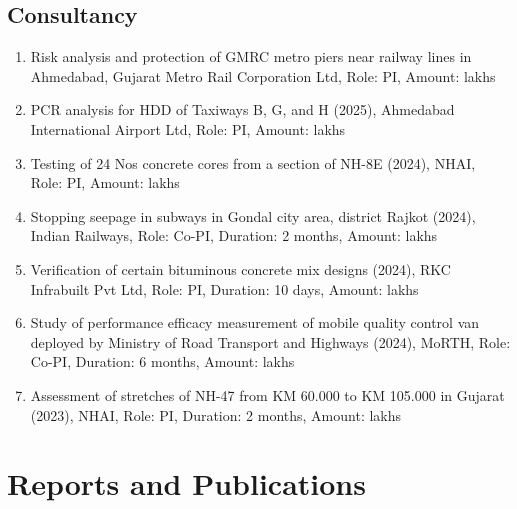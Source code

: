 \documentclass[12pt]{article}
\begin{document}
\hfill
\subsection*{Consultancy}
\begin{enumerate}
	\item Risk analysis and protection of GMRC metro piers near railway lines in Ahmedabad, Gujarat Metro Rail Corporation Ltd, Role: PI, Amount:  lakhs
	\item PCR analysis for HDD of Taxiways B, G, and H (2025), Ahmedabad International Airport Ltd, Role: PI, Amount:  lakhs
	\item Testing of 24 Nos concrete cores from a section of NH-8E (2024), NHAI, Role: PI, Amount:  lakhs
	\item Stopping seepage in subways in Gondal city area, district Rajkot (2024), Indian Railways, Role: Co-PI, Duration: 2 months, Amount:  lakhs
	\item Verification of certain bituminous concrete mix designs (2024), RKC Infrabuilt Pvt Ltd, Role: PI, Duration: 10 days, Amount:  lakhs
	\item Study of performance efficacy measurement of mobile quality control van deployed by Ministry of Road Transport and Highways (2024), MoRTH, Role: Co-PI, Duration: 6 months, Amount:  lakhs
	\item Assessment of stretches of NH-47 from KM 60.000 to KM 105.000 in Gujarat (2023), NHAI, Role: PI, Duration: 2 months, Amount:  lakhs
\end{enumerate}


\bigskip
\section*{Reports and Publications}
\hfill
\end{document}
